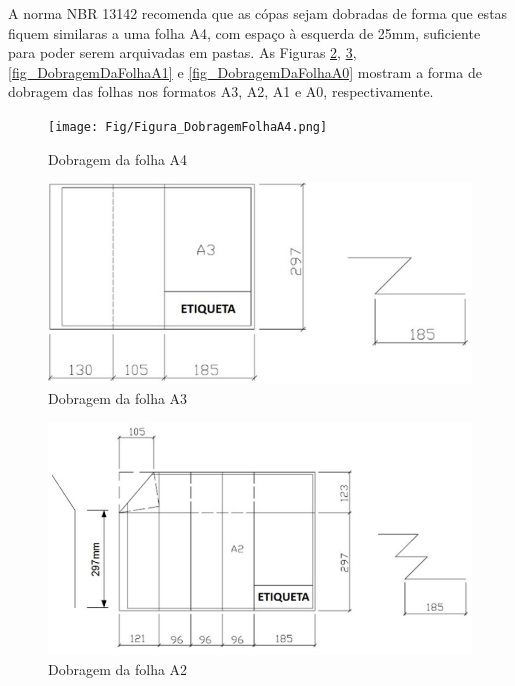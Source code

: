\documentclass{article}
\begin{document}
\hspace{1cm} A norma NBR 13142 recomenda que as cópas sejam dobradas de forma que estas fiquem similaras a uma folha A4, com espaço à esquerda de 25mm, suficiente para poder serem arquivadas em pastas. As Figuras \ref{fig_DobragemDaFolhaA3}, \ref{fig_DobragemDaFolhaA2}, \ref{fig_DobragemDaFolhaA1} e \ref{fig_DobragemDaFolhaA0} mostram a forma de dobragem das folhas nos formatos A3, A2, A1 e A0, respectivamente. 

\begin{figure} [H] %
\centering
\texttt{[image: Fig/Figura\_DobragemFolhaA4.png]} 
\caption{Dobragem da folha A4}
\label{fig_DobragemDaFolhaA4}
\end{figure}

\begin{figure} [H] %
\centering
\includegraphics[scale=0.8]{Fig/Figura_DobragemFolhaA3.png} 
\caption{Dobragem da folha A3}
\label{fig_DobragemDaFolhaA3}
\end{figure}

\begin{figure} [H] %
\centering
\includegraphics[scale=0.8]{Fig/Figura_DobragemFolhaA2.png} 
\caption{Dobragem da folha A2}
\label{fig_DobragemDaFolhaA2}
\end{figure}
\end{document}
